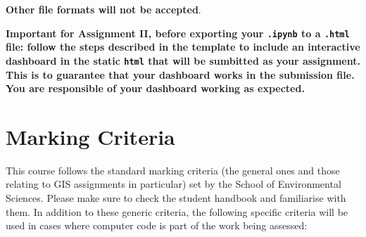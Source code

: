 \documentclass[
  letterpaper,
  DIV=11,
  numbers=noendperiod]{scrreprt}
\begin{document}
\textbf{Other file formats will not be accepted}.

\textbf{Important for Assignment II, before exporting your
\texttt{.ipynb} to a \texttt{.html} file: follow the steps described in
the template to include an interactive dashboard in the static
\texttt{html} that will be sumbitted as your assignment. This is to
guarantee that your dashboard works in the submission file. You are
responsible of your dashboard working as expected.}

\section*{Marking Criteria}\label{marking-criteria}


This course follows the standard marking criteria (the general ones and
those relating to GIS assignments in particular) set by the School of
Environmental Sciences. Please make sure to check the student handbook
and familiarise with them. In addition to these generic criteria, the
following specific criteria will be used in cases where computer code is
part of the work being assessed:
\end{document}
